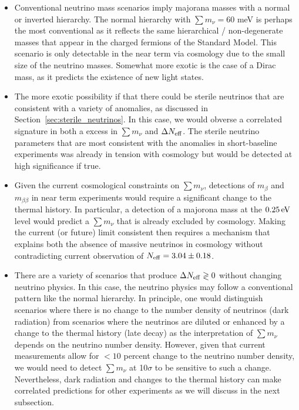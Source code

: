 \begin{itemize}
\item Conventional neutrino mass scenarios imply majorana masses with a normal or inverted hierarchy.  The normal hierarchy with $\sum m_\nu = 60$ meV is perhaps the most conventional as it reflects the same hierarchical / non-degenerate masses that appear in the charged fermions of the Standard Model.  This scenario is only detectable in the near term via cosmology due to the small size of the neutrino masses.  Somewhat more exotic is the case of a Dirac mass, as it predicts the existence of new light states.

\item The more exotic possibility if that there could be sterile neutrinos that are consistent with a variety of anomalies, as discussed in Section~\ref{sec:sterile_neutrinos}.  In this case, we would obverse a correlated signature in both a excess in $\sum m_\nu$ and $\Delta N_{\rm eff}$.  The sterile neutrino parameters that are most consistent with the anomalies in short-baseline experiments was already in tension with cosmology but would be detected at high significance if true.  

\item Given the current cosmological constraints on $\sum m_\nu$, detections of $m_\beta$ and $m_{\beta \beta}$ in near term experiments would require a significant change to the thermal history.  In particular, a detection of a majorona mass at the $0.25 \, {\rm eV}$ level would predict a $\sum m_\nu$ that is already excluded by cosmology.  Making the current (or future) limit consistent then requires a mechanism that explains both the absence of massive neutrinos in cosmology without contradicting current observation of $N_{\rm eff} = 3.04 \pm 0.18$.


\item There are a variety of scenarios that produce $\Delta N_{\rm eff}  \gtrless 0$ without changing neutrino physics.  In this case, the neutrino physics may follow a conventional pattern like the normal hierarchy.  In principle, one would distinguish scenarios where there is no change to the number density of neutrinos (dark radiation) from scenarios where the neutrinos are diluted or enhanced by a change to the thermal history (late decay) as the interpretation of $\sum m_\nu$ depends on the neutrino number density.  However, given that current measurements allow for $< 10$ percent change to the neutrino number density, we would need to detect $\sum m_\nu$ at 10$\sigma$ to be sensitive to such a change.  Nevertheless, dark radiation and changes to the thermal history can make correlated predictions for other experiments as we will discuss in the next subsection.
\end{itemize}

